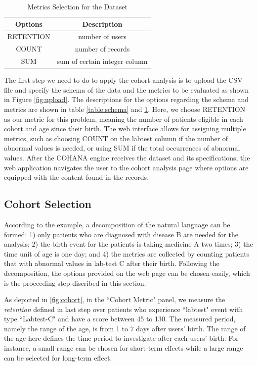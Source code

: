 \documentclass[10pt,conference,letterpaper]{IEEEtran}
\begin{document}
\begin{table}[h!]
\begin{center}
    \begin{tabular}{ | c | c | }
        \hline
        Options & Description \\[0.5ex] 
        \hline\hline
        RETENTION & number of users \\
        \hline
        COUNT & number of records \\
        \hline
        SUM & sum of certain integer column \\
        \hline
    \end{tabular}
\end{center}
\caption{Metrics Selection for the Dataset}
\label{table:metrics}
\end{table}

The first step we need to do to apply the cohort analysis is to upload the CSV file and specify the schema of the data and the metrics to be evaluated as shown in Figure \ref{fig:upload}. 
The descriptions for the options regarding the schema and metrics are shown in table \ref{table:schema} and \ref{table:metrics}. 
Here, we choose RETENTION as our metric for this problem, meaning the number of patients eligible in each cohort and age since their birth. 
The web interface allows for assigning multiple metrics, such as choosing COUNT on the labtest column if the number of abnormal values is needed, or using SUM if the total occurrences of abnormal values. 
After the COHANA engine receives the dataset and its specifications, the web application navigates the user to the cohort analysis page where options are equipped with the content found in the records.

\subsection{Cohort Selection}

According to the example, a decomposition of the natural language can be formed: 1) only patients who are diagnosed with disease B are needed for the analysis; 2) the birth event for the patients is taking medicine A two times; 3) the time unit of age is one day; and 4) the metrics are collected by counting patients that with abnormal values in lab-test C after their birth. 
Following the decomposition, the options provided on the web page can be chosen easily, which is the proceeding step discribed in this section.

As depicted in \ref{fig:cohort}, in the ``Cohort Metric" panel, we measure the \emph{retention} defined in last step over patients who experience ``labtest" event with type ``Labtest-C" and have a score between 45 to 130. 
The measured period, namely the range of the age, is from 1 to 7 days after users' birth.
The range of the age here defines the time period to investigate after each users' birth. For instance, a small range can be chosen for short-term effects while a large range can be selected for long-term effect.
\end{document}
